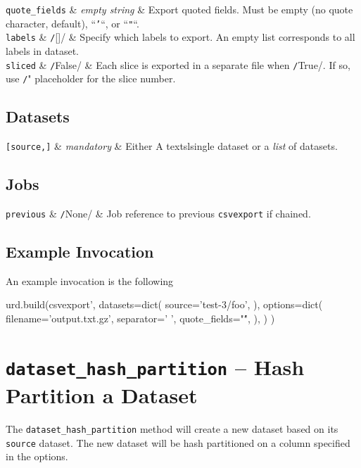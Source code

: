   \RP \texttt{quote\_fields} & \textsl{empty string} & Export quoted fields.  Must be empty
  (no quote character, default), ``\texttt{'}``, or ``\texttt{"}``.\\
  
  \RP \texttt{labels} & \texttt/[]/ & Specify which labels to
  export.  An empty list corresponds to all labels in dataset.\\
  
  \RP \texttt{sliced} & \texttt/False/ & Each slice is
  exported in a separate file when \texttt/True/.  If so,
  use \texttt/"%
  placeholder for the slice number.\\
\stoptable


\subsection*{Datasets}
\starttable
  \RP \texttt{[source,]} & \textsl{mandatory} & Either A
  textsl{single} dataset or a \textsl{list} of datasets.\\
\stoptable


\subsection*{Jobs}
\starttable
  \texttt{previous} & \texttt/None/ & Job reference to
  previous \texttt{csvexport} if chained.\\
\stoptable


\subsection{Example Invocation}
An example invocation is the following
\begin{python}
urd.build(csvexport',
    datasets=dict(
        source='test-3/foo',
    ),
    options=dict(
        filename='output.txt.gz',
        separator=' ',
        quote_fields="\'",
        ),
    )
)
\end{python}



\clearpage
\section{\texttt{dataset\_hash\_partition} -- Hash Partition a Dataset}
\label{sec:dataset_hash_partition}

The \texttt{dataset\_hash\_partition} method will create a new dataset based on
its \texttt{source} dataset.  The new dataset will be hash partitioned
on a column specified in the options.


